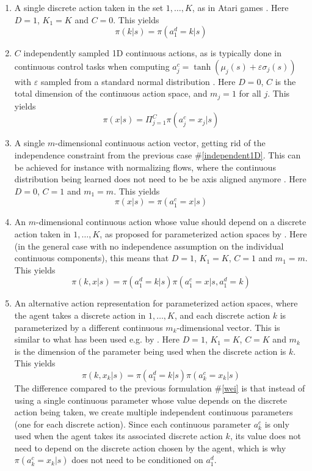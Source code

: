 \documentclass[letterpaper]{article} \usepackage{aaai20}  \usepackage{times}  \usepackage{helvet} \usepackage{courier}  \usepackage[hyphens]{url}  \usepackage{graphicx} \urlstyle{rm} \def\UrlFont{\rm}  \usepackage{graphicx}  \usepackage[section]{placeins}
\newcommand{\citet}{\cite}  \newcommand{\citep}{\cite} \DeclareMathOperator*{\softmax}{softmax}
\begin{document}
\begin{enumerate}
    \item \label{singlediscrete} A single discrete action taken in the set ${1, \ldots, K}$, as in Atari games \citep{bellemare2013}.
    Here $D = 1$, $K_1 = K$ and $C = 0$.
    This yields $$\pi(k | s) = \pi(a^d_1 = k | s)$$
    
    \item \label{independent1D} $C$ independently sampled 1D continuous actions, as is typically done in continuous control tasks when computing $a^c_j = \tanh(\mu_j(s) + \varepsilon \sigma_j(s))$ with $\varepsilon$ sampled from a standard normal distribution \citep{haarnoja2018soft}.
    Here $D = 0$, $C$ is the total dimension of the continuous action space, and $m_j = 1$ for all $j$.
    This yields $$\pi(x | s) = \Pi_{j=1}^C \pi(a^c_j = x_j | s)$$
    
    \item A single $m$-dimensional continuous action vector, getting rid of the independence constraint from the previous case \#\ref{independent1D}.
    This can be achieved for instance with normalizing flows, where the continuous distribution being learned does not need to be be axis aligned anymore \citep{mazoure2019leveraging}.
    Here $D = 0$, $C = 1$ and $m_1 = m$.
    This yields $$\pi(x | s) = \pi(a^c_1 = x | s)$$
    
    \item \label{wei}An $m$-dimensional continuous action whose value should depend on a discrete action taken in $1, \ldots, K$, as proposed for parameterized action spaces by \citet{wei2018}.
    Here (in the general case with no independence assumption on the individual continuous components), this means that $D = 1$, $K_1 = K$, $C = 1$ and $m_1 = m$.
    This yields $$\pi(k, x | s) = \pi(a^d_1 = k | s) \pi(a^c_1 = x | s, a^d_1 = k)$$
    
    \item \label{paramactions} An alternative action representation for parameterized action spaces, where the agent takes a discrete action in $1, \ldots, K$, and each discrete action $k$ is parameterized by a different continuous $m_k$-dimensional vector.
    This is similar to what has been used e.g. by \citet{bester2019}.
    Here $D = 1$, $K_1 = K$, $C = K$ and $m_k$ is the dimension of the parameter being used when the discrete action is $k$.
    This yields $$\pi(k, x_k | s) = \pi(a^d_1 = k | s) \pi(a^c_k = x_k | s)$$
    The difference compared to the previous formulation \#\ref{wei} is that instead of using a single continuous parameter whose value depends on the discrete action being taken, we create multiple independent continuous parameters (one for each discrete action).
    Since each continuous parameter $a^c_k$ is only used when the agent takes its associated discrete action $k$, its value does not need to depend on the discrete action chosen by the agent, which is why $\pi(a^c_k = x_k | s)$ does not need to be conditioned on $a^d_1$.
    

\end{enumerate}
\end{document}
